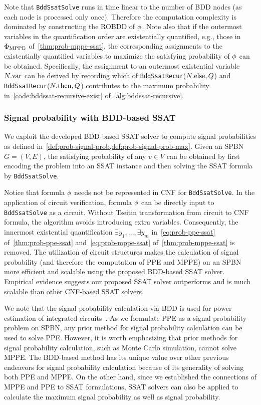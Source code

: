 Note that \texttt{BddSsatSolve} runs in time linear to the number of BDD nodes (as each node is processed only once).
Therefore the computation complexity is dominated by constructing the ROBDD of $\phi$.
Note also that if the outermost variables in the quantification order are existentially quantified, e.g.,
those in $\Phi_\mathrm{MPPE}$ of~\cref{thm:prob-mppe-ssat},
the corresponding assignments to the existentially quantified variables
to maximize the satisfying probability of $\phi$ can be obtained.
Specifically,
the assignment to an outermost existential variable $N.\mathrm{var}$ can be derived by recording which of
\texttt{BddSsatRecur}($N.\mathrm{else},Q$) and
\texttt{BddSsatRecur}($N.\mathrm{then},Q$)
contributes to the maximum probability in~\cref{code:bddssat-recursive-exist} of~\cref{alg:bddssat-recursive}.

\subsubsection{Signal probability with BDD-based SSAT}
We exploit the developed BDD-based SSAT solver to compute signal probabilities as defined in~\cref{def:prob-signal-prob,def:prob-signal-prob-max}.
Given an SPBN $G=(V,E)$,
the satisfying probability of any $v \in V$ can be obtained by first encoding the problem into an SSAT instance
and then solving the SSAT formula by \texttt{BddSsatSolve}.

Notice that formula $\phi$ needs not be represented in CNF for \texttt{BddSsatSolve}.
In the application of circuit verification,
formula $\phi$ can be directly input to \texttt{BddSsatSolve} as a circuit.
Without Tseitin transformation from circuit to CNF formula,
the algorithm avoids introducing extra variables.
Consequently, the innermost existential quantification $\exists y_1,\ldots,\exists y_m$
in~\cref{eq:prob-ppe-ssat} of~\cref{thm:prob-ppe-ssat}
and~\cref{eq:prob-mppe-ssat} of~\cref{thm:prob-mppe-ssat} is removed.
The utilization of circuit structures makes the calculation of signal probability
(and therefore the computation of PPE and MPPE) on an SPBN more efficient and scalable
using the proposed BDD-based SSAT solver.
Empirical evidence suggests our proposed SSAT solver outperforms and is much scalable than other CNF-based SSAT solvers.

We note that the signal probability calculation via BDD is used for power estimation of integrated circuits~\cite{Najm1994}.
As we formulate PPE as a signal probability problem on SPBN,
any prior method for signal probability calculation can be used to solve PPE.
However, it is worth emphasizing that prior methods for signal probability calculation,
such as Monte Carlo simulation, cannot solve MPPE.
The BDD-based method has its unique value over other previous endeavors for signal probability calculation
because of its generality of solving both PPE and MPPE.
On the other hand,
since we established the connections of MPPE and PPE to SSAT formulations,
SSAT solvers can also be applied to calculate the maximum signal probability as well as signal probability.

